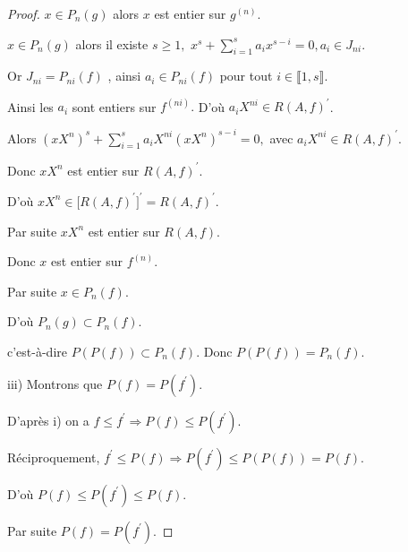 \begin{proof}
	$x\in P_{n}(g)$ alors $x$ est entier sur $g^{(n)}$.
	
	$x\in P_{n}(g)$ alors il existe $s\geq 1,$ $x^{s}+\sum\limits_{i=1}^{s}a_{i}x^{s-i}=0,a_{i}\in J_{ni}$.
	
	Or $J_{ni}=P_{ni}(f)$ , ainsi $a_{i}\in P_{ni}(f)$ pour tout $i\in \llbracket 1, s \rrbracket.$
	
	Ainsi les $a_{i}$ sont entiers sur $f^{(ni)}.$ D'où $a_{i}X^{ni}\in R(A,f)^{\prime }$.
	
	Alors $(xX^{n})^{s}+\sum\limits_{i=1}^{s}a_{i}X^{ni}(xX^{n})^{s-i}=0,$ avec 
	$a_{i}X^{ni}\in R(A,f)^{\prime }$.
	
	Donc $xX^{n}$ est entier sur $R(A,f)^{\prime }$.
	
	D'où $xX^{n}\in \lbrack R(A,f)^{\prime }]^{\prime }=R(A,f)^{\prime }$.
	
	Par suite $xX^{n}$ est entier sur $R(A,f)$.
	
	Donc $x$ est entier sur $f^{(n)}$.
	
	Par suite $x\in P_{n}(f).$
	
	D'où $P_{n}(g)\subset P_{n}(f).$
	
	c'est-\`{a}-dire $P(P(f))\subset P_{n}(f).$ Donc $P(P(f))=P_{n}(f).$
	
	iii) Montrons que $P(f)=P(f^{\prime })$.
	
	D'après i) on a $f\leq f^{\prime }\Rightarrow P(f)\leq P(f^{\prime })$.
	
	Réciproquement, $f^{\prime }\leq P(f)\Rightarrow P(f^{\prime })\leq
	P(P(f))=P(f)$.
	
	D'où $P(f)\leq P(f^{\prime })\leq P(f)$.
	
	Par suite $P(f)=P(f^{\prime })$.
\end{proof}

